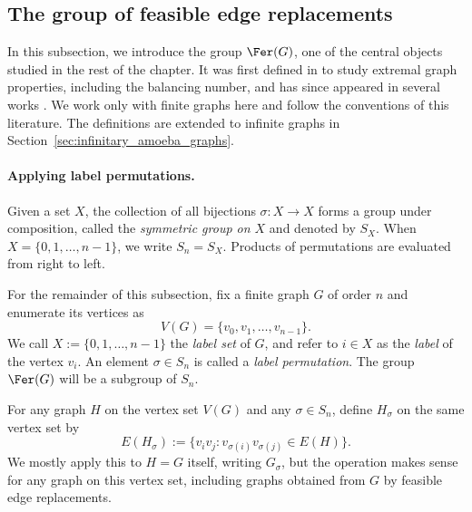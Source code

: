 
\subsection{The group of feasible edge replacements}\label{subsec:fer}

In this subsection, we introduce the group $\Fer(G)$, one of the central objects studied in the rest of the chapter.
It was first defined in \cite{Caro2020GraphsIU} to study extremal graph properties, including the balancing number, and has since appeared in several works \cite{unavoidable_chromatic, caro2022evolution, Caro_small_balanceable, Eslavaetal2025, gonzalezlaffitte2022amoebas}.
We work only with finite graphs here and follow the conventions of this literature.
The definitions are extended to infinite graphs in Section~\ref{sec:infinitary_amoeba_graphs}.

\paragraph{Applying label permutations.}

\begin{definition}\label{def:S_n}
    Given a set $X$, the collection of all bijections $\sigma\colon X\to X$ forms a group under composition, called the \emph{symmetric group on $X$} and denoted by $S_X$.
    When $X=\{0,1,\dots,n-1\}$, we write $S_n=S_X$.
    Products of permutations are evaluated from right to left.
\end{definition}

For the remainder of this subsection, fix a finite graph $G$ of order $n$ and enumerate its vertices as
\[
    V(G)=\{v_0,v_1,\dots,v_{n-1}\}.
\]
We call $X:=\{0,1,\dots,n-1\}$ the \emph{label set} of $G$, and refer to $i\in X$ as the \emph{label} of the vertex $v_i$.
An element $\sigma\in S_n$ is called a \emph{label permutation}.
The group $\Fer(G)$ will be a subgroup of $S_n$.

\begin{definition}\label{def:G_sigma}
    For any graph $H$ on the vertex set $V(G)$ and any $\sigma\in S_n$, define $H_\sigma$ on the same vertex set by
    \[
        E(H_\sigma):=\{v_iv_j:v_{\sigma(i)}v_{\sigma(j)}\in E(H)\}.
    \]
    We mostly apply this to $H=G$ itself, writing $G_\sigma$, but the operation makes sense for any graph on this vertex set, including graphs obtained from $G$ by feasible edge replacements.
\end{definition}

